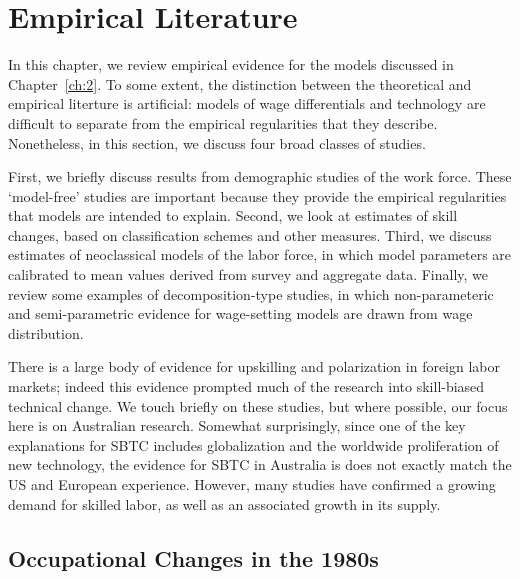\chapter{Empirical Literature}\label{ch:3}

In this chapter, we review empirical evidence for the models discussed in Chapter~\ref{ch:2}. To some extent, the distinction between the theoretical and empirical literture is artificial: models of wage differentials and technology are difficult to separate from the empirical regularities that they describe. Nonetheless, in this section, we discuss four broad classes of studies.

First, we briefly discuss results from demographic studies of the work force. These `model-free' studies are important because they provide the empirical regularities that models are intended to explain. Second, we look at estimates of skill changes, based on classification schemes and other measures. Third, we discuss estimates of neoclassical models of the labor force, in which model parameters are calibrated to mean values derived from survey and aggregate data. Finally, we review some examples of decomposition-type studies, in which non-parameteric and semi-parametric evidence for wage-setting models are drawn from wage distribution.

There is a large body of evidence for upskilling and polarization in foreign labor markets; indeed this evidence prompted much of the research into skill-biased technical change. We touch briefly on these studies, but where possible, our focus here is on Australian research. Somewhat surprisingly, since one of the key explanations for SBTC includes globalization and the worldwide proliferation of new technology, the evidence for SBTC in Australia is does not exactly match the US and European experience. However, many studies have confirmed a growing demand for skilled labor, as well as an associated growth in its supply.

\section{Occupational Changes in the 1980s}

